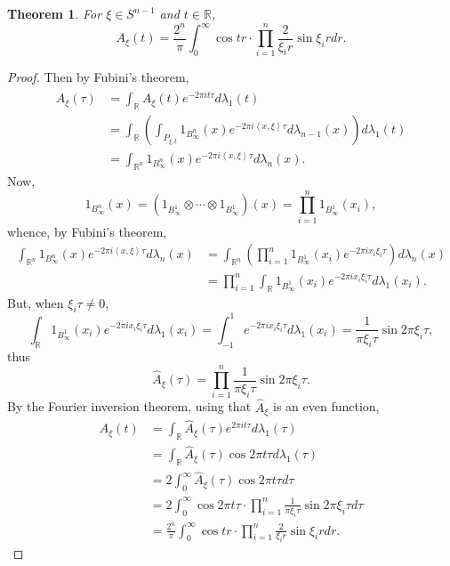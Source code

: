 \documentclass{article}
\newcommand{\inner}[2]{\left\langle #1, #2 \right\rangle}
\newtheorem{theorem}{Theorem}
\theoremstyle{definition}
\begin{document}
\begin{theorem}
For $\xi \in S^{n-1}$ and $t \in \mathbb{R}$,
\[
A_\xi(t) = \frac{2^n}{\pi} \int_0^\infty \cos tr \cdot \prod_{i=1}^n \frac{2}{\xi_i r} \sin \xi_i r dr.
\]
\end{theorem}
\begin{proof}
Then by Fubini's theorem,
\begin{align*}
\widehat{A}_\xi(\tau) &= \int_{\mathbb{R}} A_\xi(t) e^{-2\pi it\tau} d\lambda_1(t)\\
&=\int_{\mathbb{R}} \left(\int_{P_{\xi,t}} 1_{B_\infty^n}(x) e^{-2\pi i\inner{x}{\xi} \tau}  d\lambda_{n-1}(x)\right) 
d\lambda_1(t)\\
&=\int_{\mathbb{R}^n} 1_{B_\infty^n}(x) e^{-2\pi i\inner{x}{\xi}\tau} d\lambda_n(x).
\end{align*}
Now, 
\[
1_{B_\infty^n}(x) = (1_{B_\infty^1} \otimes \cdots \otimes 1_{B_\infty^1})(x)
=\prod_{i=1}^n 1_{B_\infty^1}(x_i),
\]
whence, by Fubini's theorem,
\begin{align*}
\int_{\mathbb{R}^n} 1_{B_\infty^n}(x) e^{-2\pi i\inner{x}{\xi}\tau} d\lambda_n(x)&=
\int_{\mathbb{R}^n} \left(\prod_{i=1}^n 1_{B_\infty^1}(x_i) e^{-2\pi i x_i \xi_i \tau}\right) d\lambda_n(x)\\
&=\prod_{i=1}^n \int_{\mathbb{R}} 1_{B_\infty^1}(x_i) e^{-2\pi i x_i \xi_i \tau} d\lambda_1(x_i).
\end{align*}
But, when $\xi_i \tau \neq 0$,
\[
\int_{\mathbb{R}} 1_{B_\infty^1}(x_i) e^{-2\pi i x_i \xi_i \tau} d\lambda_1(x_i)
=\int_{-1}^1 
 e^{-2\pi i x_i \xi_i \tau} d\lambda_1(x_i)
 =\frac{1}{\pi \xi_i \tau} \sin 2\pi \xi_i \tau,
\]
thus
\[
\widehat{A}_\xi(\tau) = \prod_{i=1}^n \frac{1}{\pi \xi_i \tau} \sin 2\pi \xi_i \tau.
\]
By the Fourier inversion theorem, using that $\widehat{A}_\xi$ is an even function,
\begin{align*}
A_\xi(t) &= \int_{\mathbb{R}} \widehat{A}_\xi(\tau) e^{2\pi it\tau} d\lambda_1(\tau)\\
&=\int_{\mathbb{R}}  \widehat{A}_\xi(\tau) \cos 2\pi t \tau d\lambda_1(\tau)\\
&=2 \int_0^\infty  \widehat{A}_\xi(\tau) \cos 2\pi t \tau d\tau\\
&=2 \int_0^\infty  \cos 2\pi t \tau \cdot \prod_{i=1}^n \frac{1}{\pi \xi_i \tau} \sin 2\pi \xi_i \tau d\tau\\
&=\frac{2^n}{\pi} \int_0^\infty \cos tr \cdot \prod_{i=1}^n \frac{2}{\xi_i r} \sin \xi_i r dr.
\end{align*}
\end{proof}
\end{document}
